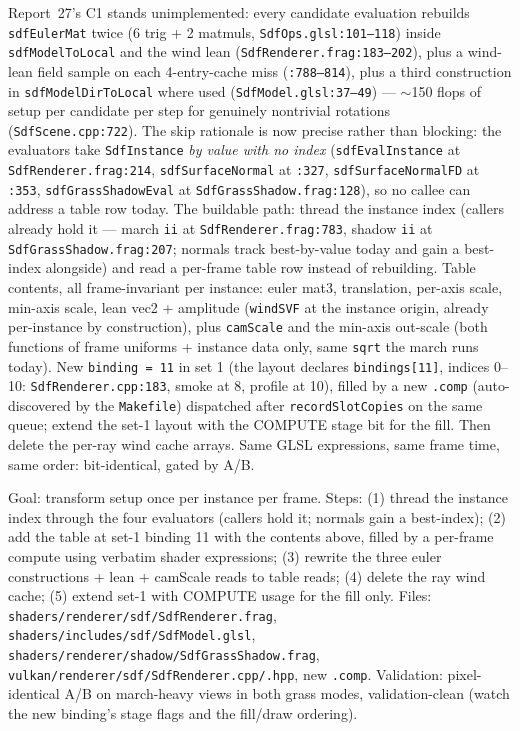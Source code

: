 \documentclass[11pt,a4paper]{article}
\begin{document}
Report~27's C1 stands unimplemented: every candidate evaluation rebuilds
\texttt{sdfEulerMat} twice (6 trig + 2 matmuls,
\texttt{SdfOps.glsl:101--118}) inside \texttt{sdfModelToLocal} and the
wind lean (\texttt{SdfRenderer.frag:183--202}), plus a wind-lean field
sample on each 4-entry-cache miss (\texttt{:788--814}), plus a third
construction in \texttt{sdfModelDirToLocal} where used
(\texttt{SdfModel.glsl:37--49}) --- $\sim$150 flops of setup per candidate
per step for genuinely nontrivial rotations
(\texttt{SdfScene.cpp:722}). The skip rationale is now precise rather than
blocking: the evaluators take \texttt{SdfInstance} \emph{by value with no
index} (\texttt{sdfEvalInstance} at \texttt{SdfRenderer.frag:214},
\texttt{sdfSurfaceNormal} at \texttt{:327},
\texttt{sdfSurfaceNormalFD} at \texttt{:353},
\texttt{sdfGrassShadowEval} at \texttt{SdfGrassShadow.frag:128}), so no
callee can address a table row today. The buildable path: thread the
instance index (callers already hold it --- march \texttt{ii} at
\texttt{SdfRenderer.frag:783}, shadow \texttt{ii} at
\texttt{SdfGrassShadow.frag:207}; normals track best-by-value today and
gain a best-index alongside) and read a per-frame table row instead of
rebuilding. Table contents, all frame-invariant per instance: euler mat3,
translation, per-axis scale, min-axis scale, lean vec2 + amplitude
(\texttt{windSVF} at the instance origin, already per-instance by
construction), plus \texttt{camScale} and the min-axis out-scale (both
functions of frame uniforms + instance data only, same \texttt{sqrt} the
march runs today). New \texttt{binding = 11} in set 1 (the layout declares
\texttt{bindings[11]}, indices 0--10:
\texttt{SdfRenderer.cpp:183}, smoke at 8, profile at 10), filled by a new
\texttt{.comp} (auto-discovered by the \texttt{Makefile}) dispatched after
\texttt{recordSlotCopies} on the same queue; extend the set-1 layout with
the COMPUTE stage bit for the fill. Then delete the per-ray wind cache
arrays. Same GLSL expressions, same frame time, same order: bit-identical,
gated by A/B.

\begin{tcolorbox}[promptbox={Prompt --- C1: SDF frame table with index threading}]
Goal: transform setup once per instance per frame. Steps: (1) thread the
instance index through the four evaluators (callers hold it; normals gain a
best-index); (2) add the table at set-1 binding 11 with the contents above,
filled by a per-frame compute using verbatim shader expressions;
(3) rewrite the three euler constructions + lean + camScale reads to table
reads; (4) delete the ray wind cache; (5) extend set-1 with COMPUTE usage
for the fill only. Files: \texttt{shaders/renderer/sdf/SdfRenderer.frag},
\texttt{shaders/includes/sdf/SdfModel.glsl},
\texttt{shaders/renderer/shadow/SdfGrassShadow.frag},
\texttt{vulkan/renderer/sdf/SdfRenderer.cpp/.hpp}, new \texttt{.comp}.
Validation: pixel-identical A/B on march-heavy views in both grass modes,
validation-clean (watch the new binding's stage flags and the fill/draw
ordering).
\end{tcolorbox}
\end{document}

